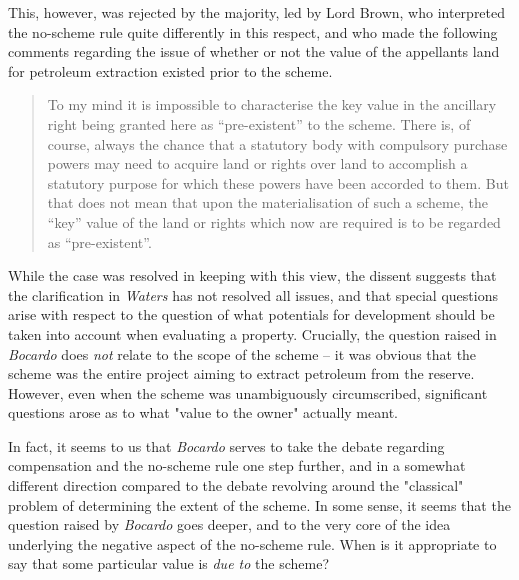 This, however, was rejected by the majority, led by Lord Brown, who interpreted the no-scheme rule quite differently in this respect, and who made the following comments regarding the issue of whether or not the value of the appellants land for petroleum extraction existed prior to the scheme.

\begin{quote}To my mind it is impossible to characterise the key value in the ancillary
right being granted here as “pre-existent” to the scheme. There is, of course,
always the chance that a statutory body with compulsory purchase powers may
need to acquire land or rights over land to accomplish a statutory purpose for
which these powers have been accorded to them. But that does not mean that upon
the materialisation of such a scheme, the “key” value of the land or rights which
now are required is to be regarded as “pre-existent”.
\end{quote}

While the case was resolved in keeping with this view, the dissent suggests that the clarification in \emph{Waters} has not resolved all issues, and that special questions arise with respect to the question of what potentials for development should be taken into account when evaluating a property. Crucially, the question raised in \emph{Bocardo} does \emph{not} relate to the scope of the scheme -- it was obvious that the scheme was the entire project aiming to extract petroleum from the reserve. However, even when the scheme was unambiguously circumscribed, significant questions arose as to what "value to the owner" actually meant. 

In fact, it seems to us that \emph{Bocardo} serves to take the debate regarding compensation and the no-scheme rule one step further, and in a somewhat different direction compared to the debate revolving around the "classical" problem of determining the extent of the scheme. In some sense, it seems that the question raised by \emph{Bocardo} goes deeper, and to the very core of the idea underlying the negative aspect of the no-scheme rule. When is it appropriate to say that some particular value is \emph{due to} the scheme?

